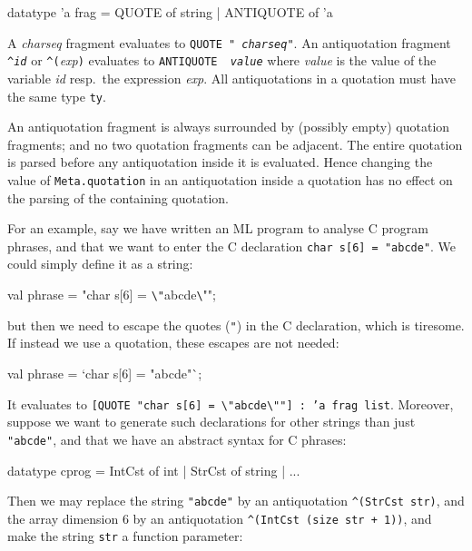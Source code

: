 \documentclass[fleqn,a4paper]{article}
\begin{document}
\begin{program}
datatype 'a frag = QUOTE of string | ANTIQUOTE of 'a
\end{program}

\noindent A {\it charseq\/} fragment evaluates to {\tt QUOTE "{\it
    charseq\/}"}.  An antiquotation fragment {\tt \verb#^#{\it id\/}}
or {\tt \verb#^#(}{\it exp\/}{\tt )} evaluates to {\tt ANTIQUOTE {\it
    value\/}} where {\it value\/} is the value of the variable {\it
  id\/} resp.\ the expression {\it exp\/}.  All antiquotations in a
quotation must have the same type {\tt ty}.

An antiquotation fragment is always surrounded by (possibly empty)
quotation fragments; and no two quotation fragments can be adjacent.
The entire quotation is parsed before any antiquotation inside it is
evaluated.  Hence changing the value of {\tt Meta.quotation} in an
antiquotation inside a quotation has no effect on the parsing of the
containing quotation.

For an example, say we have written an ML program to analyse C program
phrases, and that we want to enter the C declaration {\tt char s[6] =
  "abcde"}.  We could simply define it as a string:

\begin{program}
val phrase = "char s[6] = \verb#\"#abcde\verb#\#"";
\end{program}

\noindent but then we need to escape the quotes ({\tt "}) in the C
declaration, which is tiresome.  If instead we use a quotation, these
escapes are not needed:

\begin{program}
val phrase = `char s[6] = "abcde"`;
\end{program}

\noindent It evaluates to {\tt [QUOTE "char s[6] =
  \verb#\"#abcde\verb#\#""] :\ 'a frag list}.  Moreover, suppose we
want to generate such declarations for other strings than just {\tt
  "abcde"}, and that we have an abstract syntax for C phrases:

\begin{program}
datatype cprog =
    IntCst of int
  | StrCst of string
  | ...  
\end{program}

\noindent Then we may replace the string {\tt "abcde"} by an
antiquotation {\tt \verb#^#(StrCst str)}, and the array dimension 6 by
an antiquotation {\tt \verb#^#(IntCst (size str + 1))}, and make the
string {\tt str} a function parameter:
\end{document}

